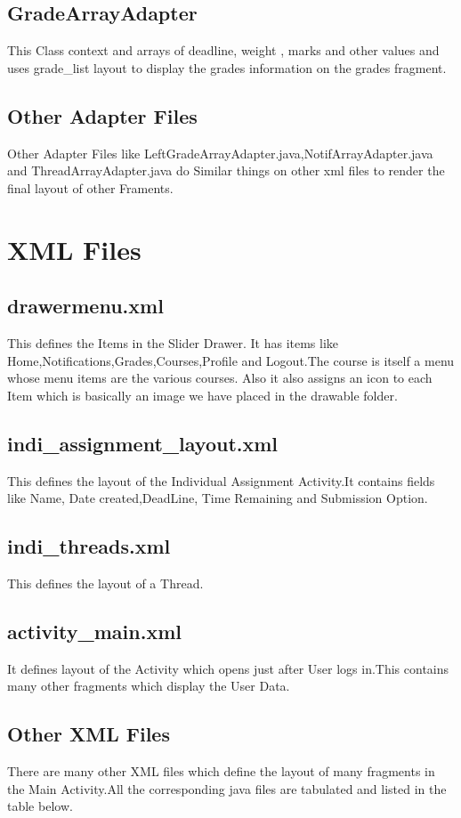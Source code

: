 \documentclass[a4paper,man,natbib]{apa6}
\begin{document}
\subsection{GradeArrayAdapter}
This Class context and arrays of deadline, weight , marks and other values and uses grade\_list layout to display the grades information on the grades fragment.
\subsection{Other Adapter Files}
Other Adapter Files like LeftGradeArrayAdapter.java,NotifArrayAdapter.java  and ThreadArrayAdapter.java do Similar things on other xml files to render the final layout of other Framents.

\section{XML Files}
\label{sec:examples}

\subsection{drawermenu.xml}
This defines the Items in the Slider Drawer. It has items like Home,Notifications,Grades,Courses,Profile and Logout.The course is itself a menu whose menu items are the various courses. Also it also assigns an icon to each Item which is basically an image we have placed in the drawable folder. 
\subsection{indi\_assignment\_layout.xml}
This defines the layout of the Individual Assignment Activity.It contains fields like Name, Date created,DeadLine, Time Remaining and Submission Option.
\subsection{indi\_threads.xml}
This defines the layout of a Thread.
\subsection{activity\_main.xml}
It defines layout of the Activity which opens just after User logs in.This contains many other fragments which display the User Data.
\subsection{Other XML Files}
There are many other XML files which define the layout of many fragments in the Main Activity.All the corresponding java files are tabulated and listed in the table below. 
\end{document}
